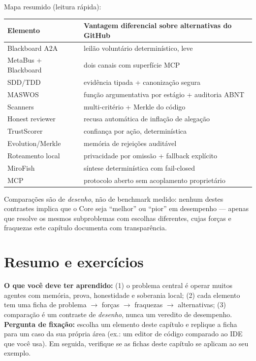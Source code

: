 \begin{resultado}
Mapa resumido (leitura rápida):\par
\smallskip
{\footnotesize
\begin{tabularx}{\linewidth}{Yl}
\toprule
Elemento & Vantagem diferencial sobre alternativas do GitHub \\
\midrule
Blackboard A2A & leilão voluntário determinístico, leve \\
MetaBus + Blackboard & dois canais com superfície MCP \\
SDD/TDD & evidência tipada + canonização segura \\
MASWOS & função argumentativa por estágio + auditoria ABNT \\
Scanners & multi-critério + Merkle do código \\
Honest reviewer & recusa automática de inflação de alegação \\
TrustScorer & confiança por ação, determinística \\
Evolution/Merkle & memória de rejeições auditável \\
Roteamento local & privacidade por omissão + fallback explícito \\
MiroFish & síntese determinística com fail-closed \\
MCP & protocolo aberto sem acoplamento proprietário \\
\bottomrule
\end{tabularx}\par}
\end{resultado}

\begin{limite}
Comparações são de \emph{desenho}, não de benchmark medido: nenhum destes
contrastes implica que o Core seja ``melhor'' ou ``pior'' em desempenho — apenas
que resolve os mesmos subproblemas com escolhas diferentes, cujas forças e
fraquezas este capítulo documenta com transparência.
\end{limite}

\section{Resumo e exercícios}

\begin{resultado}
\textbf{O que você deve ter aprendido:} (1) o problema central é operar muitos
agentes com memória, prova, honestidade e soberania local; (2) cada elemento tem
uma ficha de problema $\to$ forças $\to$ fraquezas $\to$ alternativas; (3)
comparação é um contraste de \emph{desenho}, nunca um veredito de desempenho.
\textbf{Pergunta de fixação:} escolha um elemento deste capítulo e replique a
ficha para um caso da sua própria área (ex.: um editor de código comparado ao
IDE que você usa). Em seguida, verifique se as fichas deste capítulo se aplicam
ao seu exemplo.
\end{resultado}

